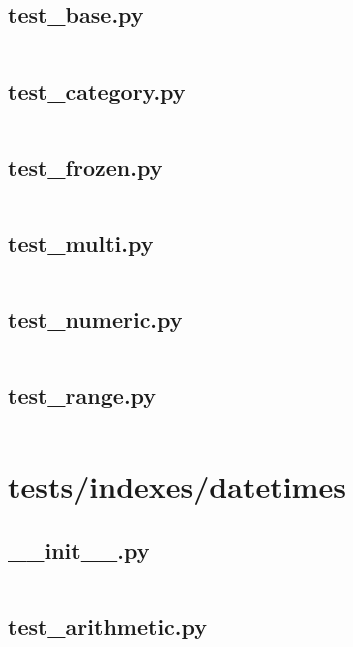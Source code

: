 \documentclass{article}
\begin{document}
\subsection{test\_base.py}
\inputminted{python}{/home/dufferzafar/dev/@clones/pandas/pandas/tests/indexes/test_base.py}
\newpage

\subsection{test\_category.py}
\inputminted{python}{/home/dufferzafar/dev/@clones/pandas/pandas/tests/indexes/test_category.py}
\newpage

\subsection{test\_frozen.py}
\inputminted{python}{/home/dufferzafar/dev/@clones/pandas/pandas/tests/indexes/test_frozen.py}
\newpage

\subsection{test\_multi.py}
\inputminted{python}{/home/dufferzafar/dev/@clones/pandas/pandas/tests/indexes/test_multi.py}
\newpage

\subsection{test\_numeric.py}
\inputminted{python}{/home/dufferzafar/dev/@clones/pandas/pandas/tests/indexes/test_numeric.py}
\newpage

\subsection{test\_range.py}
\inputminted{python}{/home/dufferzafar/dev/@clones/pandas/pandas/tests/indexes/test_range.py}
\newpage

\section{tests/indexes/datetimes}

\subsection{\_\_init\_\_.py}
\inputminted{python}{/home/dufferzafar/dev/@clones/pandas/pandas/tests/indexes/datetimes/__init__.py}
\newpage

\subsection{test\_arithmetic.py}
\inputminted{python}{/home/dufferzafar/dev/@clones/pandas/pandas/tests/indexes/datetimes/test_arithmetic.py}
\newpage
\end{document}
